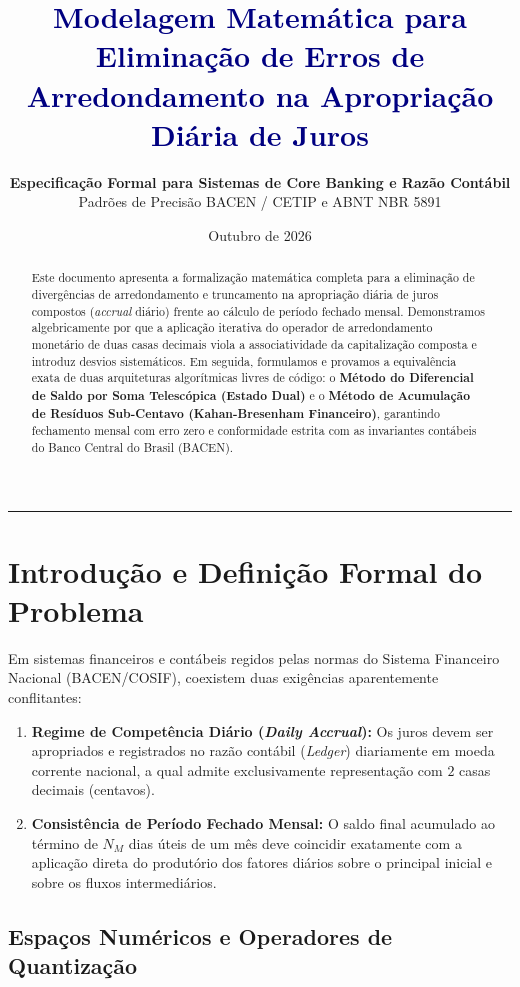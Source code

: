 \documentclass[11pt, a4paper]{article}
\title{\textbf{\textcolor{navy}{Modelagem Matemática para Eliminação de Erros de Arredondamento na Apropriação Diária de Juros}}}
\author{\textbf{Especificação Formal para Sistemas de Core Banking e Razão Contábil}\\Padrões de Precisão BACEN / CETIP e ABNT NBR 5891}
\date{Outubro de 2026}
\begin{document}
\maketitle

\begin{abstract}
\noindent Este documento apresenta a formalização matemática completa para a eliminação de divergências de arredondamento e truncamento na apropriação diária de juros compostos (\textit{accrual} diário) frente ao cálculo de período fechado mensal. Demonstramos algebricamente por que a aplicação iterativa do operador de arredondamento monetário de duas casas decimais viola a associatividade da capitalização composta e introduz desvios sistemáticos. Em seguida, formulamos e provamos a equivalência exata de duas arquiteturas algorítmicas livres de código: o \textbf{Método do Diferencial de Saldo por Soma Telescópica (Estado Dual)} e o \textbf{Método de Acumulação de Resíduos Sub-Centavo (Kahan-Bresenham Financeiro)}, garantindo fechamento mensal com erro zero e conformidade estrita com as invariantes contábeis do Banco Central do Brasil (BACEN).
\end{abstract}

\vspace{0.4cm}
\hrule
\vspace{0.6cm}

\section{Introdução e Definição Formal do Problema}

Em sistemas financeiros e contábeis regidos pelas normas do Sistema Financeiro Nacional (BACEN/COSIF), coexistem duas exigências aparentemente conflitantes:
\begin{enumerate}
    \item \textbf{Regime de Competência Diário (\textit{Daily Accrual}):} Os juros devem ser apropriados e registrados no razão contábil (\textit{Ledger}) diariamente em moeda corrente nacional, a qual admite exclusivamente representação com $2$ casas decimais (centavos).
    \item \textbf{Consistência de Período Fechado Mensal:} O saldo final acumulado ao término de $N_M$ dias úteis de um mês deve coincidir exatamente com a aplicação direta do produtório dos fatores diários sobre o principal inicial e sobre os fluxos intermediários.
\end{enumerate}

\subsection{Espaços Numéricos e Operadores de Quantização}
\end{document}

